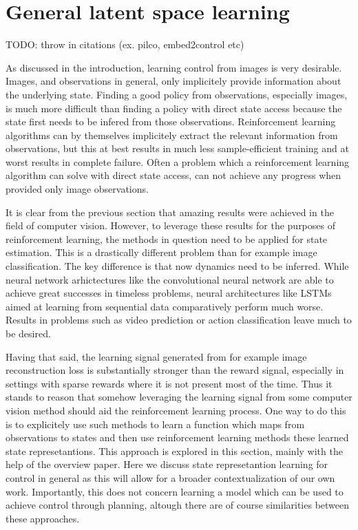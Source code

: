 \section{General latent space learning}
TODO: throw in citations (ex. pilco, embed2control etc)

As discussed in the introduction, learning control from images is 
very desirable. Images, and observations in general, only implicitely 
provide information about the underlying state. 
Finding a good policy from observations, especially images,
is much more difficult than finding a policy with direct state access
because the state first needs to be infered from those observations.
Reinforcement learning algorithms can by themselves implicitely extract
the relevant information from observations, but this at best results
in much less sample-efficient training and at worst results
in complete failure.
Often a problem which a reinforcement learning algorithm can solve
with direct state access, can not achieve any progress when
provided only image observations.

It is clear from the previous section that
amazing results were achieved in the field of computer vision.
However, to leverage these results for the purposes of reinforcement
learning, the methods in question need to be applied for state estimation.
This is a drastically different problem than for example image classification.
The key difference is that now dynamics need to be inferred.
While neural network arhictectures like the convolutional neural network
are able to achieve great successes in timeless problems, 
neural architectures like LSTMs aimed at learning from sequential data
comparatively perform much worse.
Results in problems such as video prediction or action classification leave much to be desired.

Having that said, the learning signal generated from for example
image reconstruction loss is substantially stronger than the reward signal,
especially in settings with sparse rewards where it is 
not present most of the time.
Thus it stands to reason that somehow leveraging the learning
signal from some computer vision method should aid the reinforcement learning 
process. 
One way to do this is to explicitely use such methods to learn 
a function which maps from observations to states
and then use reinforcement learning methods these learned state
represetantions.
This approach is explored in this section, mainly with the help
of the 
\cite{staterepresentationlearningoverview}
overview paper.
Here we discuss state represetantion learning for control in general
as this will allow for a broader contextualization of our own work.
Importantly, this does not concern learning a model 
which can be used to achieve control through planning,
altough there are of course similarities between these approaches.

